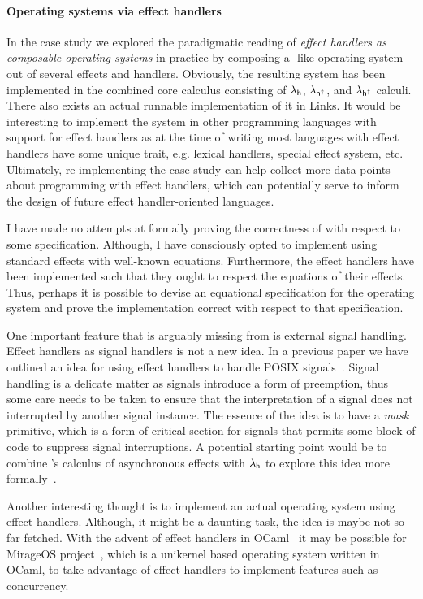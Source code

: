 \documentclass[12pt,phd,lfcs,twoside,openright,logo,leftchapter,normalheadings]{infthesis}
\theoremstyle{plain}
\theoremstyle{definition}
\begin{document}
\paragraph{Operating systems via effect handlers}
In the \UNIX{} case study we explored the paradigmatic reading of
\emph{effect handlers as composable operating systems} in practice by
composing a \UNIX{}-like operating system out of several effects and
handlers. Obviously, the resulting system \OSname{} has been
implemented in the combined core calculus consisting of $\lambda_{\mathsf{h}}$,
$\lambda_{\mathsf{h^\dagger}}$, and $\lambda_{\mathsf{h^{\ddagger}}}$ calculi. There also exists an actual runnable
implementation of it in Links. It would be interesting to implement
the system in other programming languages with support for effect
handlers as at the time of writing most languages with effect handlers
have some unique trait, e.g. lexical handlers, special effect system,
etc. Ultimately, re-implementing the case study can help collect more
data points about programming with effect handlers, which can
potentially serve to inform the design of future effect
handler-oriented languages.

I have made no attempts at formally proving the correctness of
\OSname{} with respect to some specification. Although, I have
consciously opted to implement \OSname{} using standard effects with
well-known equations. Furthermore, the effect handlers have been
implemented such that they ought to respect the equations of their
effects. Thus, perhaps it is possible to devise an equational
specification for the operating system and prove the implementation
correct with respect to that specification.

One important feature that is arguably missing from \OSname{} is
external signal handling. Effect handlers as signal handlers is not a
new idea. In a previous paper we have outlined an idea for using
effect handlers to handle POSIX signals~\cite{DolanEHMSW17}. Signal
handling is a delicate matter as signals introduce a form of
preemption, thus some care needs to be taken to ensure that the
interpretation of a signal does not interrupted by another signal
instance. The essence of the idea is to have a \emph{mask} primitive,
which is a form of critical section for signals that permits some
block of code to suppress signal interruptions. A potential starting
point would be to combine \citeauthor{AhmanP21}'s calculus of
asynchronous effects with $\lambda_{\mathsf{h}}$ to explore this idea more
formally~\cite{AhmanP21}.

Another interesting thought is to implement an actual operating system
using effect handlers. Although, it might be a daunting task, the idea
is maybe not so far fetched. With the advent of effect handlers in
OCaml~\cite{SivaramakrishnanDWKJM21} it may be possible for MirageOS
project~\cite{MadhavapeddyS14}, which is a unikernel based operating
system written in OCaml, to take advantage of effect handlers to
implement features such as concurrency.
\end{document}
